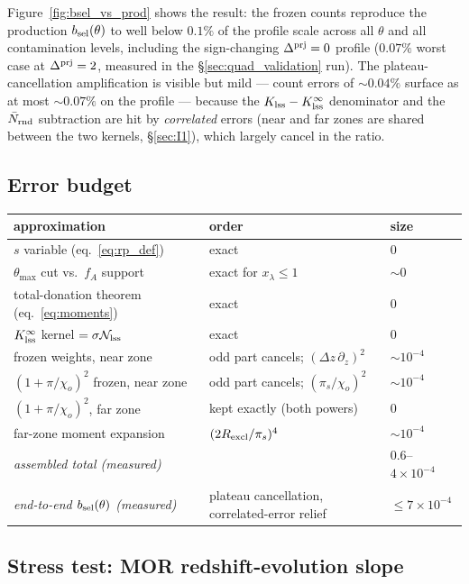 \documentclass[a4paper, 11pt]{article}
\newcommand{\dprj}{\Delta^{\rm prj}}
\newcommand{\Rex}{R_{\rm excl}}
\newcommand{\rp}{s}
\newcommand{\bsel}{b_{\rm sel}}
\newcommand{\Ncal}{\mathcal{N}}
\newcommand{\Nbar}{\bar{N}_{\rm rnd}}
\newcommand{\Klss}{K_{\rm lss}}
\newcommand{\KlssInf}{K_{\rm lss}^{\infty}}
\begin{document}
Figure~\ref{fig:bsel_vs_prod} shows the result: the frozen
counts reproduce the production $\bsel(\theta)$ to well below
$0.1\%$ of the profile scale across all $\theta$ and all
contamination levels, including the sign-changing $\dprj=0$
profile ($0.07\%$ worst case at $\dprj=2$, measured in the
\S\ref{sec:quad_validation} run). The plateau-cancellation
amplification is visible but mild --- count errors of
$\sim0.04\%$ surface as at most $\sim0.07\%$ on the profile ---
because the $\Klss-\KlssInf$ denominator and the $\Nbar$
subtraction are hit by \emph{correlated} errors (near and far
zones are shared between the two kernels, \S\ref{sec:I1}), which
largely cancel in the ratio.

\subsection{Error budget}
\begin{center}
\small
\begin{tabular}{l l l}
\toprule
approximation & order & size \\
\midrule
$\rp$ variable (eq.~\ref{eq:rp_def}) & exact & $0$ \\
$\theta_{\max}$ cut vs.\ $f_A$ support & exact for $x_\lambda\le1$ & $\sim0$ \\
total-donation theorem (eq.~\ref{eq:moments}) & exact & $0$ \\
$\KlssInf$ kernel $=\sigma\Ncal_{\rm lss}$ & exact & $0$ \\
frozen weights, near zone & odd part cancels; $(\Delta z\,\partial_z)^2$ & $\sim10^{-4}$ \\
$(1+\pi/\chi_o)^2$ frozen, near zone & odd part cancels; $(\pi_s/\chi_o)^2$ & $\sim10^{-4}$ \\
$(1+\pi/\chi_o)^2$, far zone & kept exactly (both powers) & $0$ \\
far-zone moment expansion & $(2\Rex/\pi_s)^4$ & $\sim10^{-4}$ \\
\emph{assembled total (measured)} & & $0.6$--$4\times10^{-4}$ \\
\emph{end-to-end $\bsel(\theta)$ (measured)} & plateau cancellation, correlated-error relief & $\le 7\times10^{-4}$ \\
\bottomrule
\end{tabular}
\end{center}

\subsection{Stress test: MOR redshift-evolution slope}
\label{sec:mor_stress}
\end{document}
